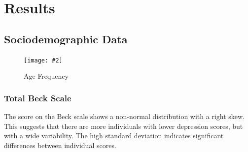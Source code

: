 \documentclass[jou]{apa7}
\newcommand{\includegraphicsmax}[2][]{%
	\texttt{[image: \#2]}%
}
\begin{document}
\section{Results}\label{resultados}

\subsection{Sociodemographic Data}

\begin{figure}[!ht]
	\centering
	\includegraphicsmax{freq.age.pdf}
	\caption{Age Frequency}
	\label{fig:Figure1}
\end{figure}

\begin{table}[!ht]
	\centering

	\caption{Descriptive statistics of the variables}

	\label{tab:descriptives}
\end{table}


\subsubsection{Total Beck Scale}
The score on the Beck scale shows a non-normal distribution with a right skew. This suggests that there are more individuals with lower depression scores, but with a wide variability. The high standard deviation indicates significant differences between individual scores.
\end{document}
